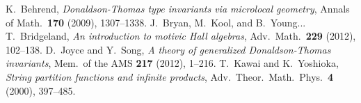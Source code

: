 \documentclass{amsart}
\theoremstyle{definition}
\begin{document}
     
\begin{thebibliography}{MNOP}
 K.~Behrend, \textit{Donaldson-Thomas type invariants via microlocal geometry}, Annals of Math.~\textbf{170} (2009), 1307--1338.
 J.~Bryan, M.~Kool, and B.~Young...
 T.~Bridgeland, \textit{An introduction to motivic Hall algebras}, Adv.~Math.~\textbf{229} (2012), 102--138.
 D.~Joyce and Y.~Song, \textit{A theory of generalized Donaldson-Thomas invariants}, Mem.~of the AMS \textbf{217} (2012), 1--216.
 T.~Kawai and K.~Yoshioka, \emph{String partition functions and infinite products}, Adv.~Theor.~Math.~Phys.~\textbf{4} (2000), 397--485.

\end{thebibliography}
\end{document}
